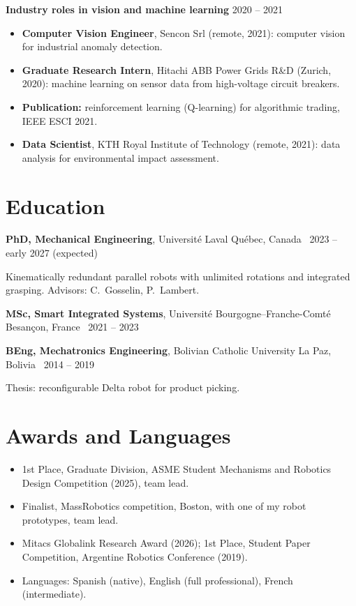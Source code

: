 \documentclass[10pt,letterpaper]{article}
\begin{document}
\vspace{3pt}
\textbf{Industry roles in vision and machine learning} \hfill {\color{muted}2020 -- 2021}\par
\begin{itemize}
\item \textbf{Computer Vision Engineer}, Sencon Srl (remote, 2021): computer vision for industrial anomaly detection.
\item \textbf{Graduate Research Intern}, Hitachi ABB Power Grids R\&D (Zurich, 2020): machine learning on sensor data from high-voltage circuit breakers.
\item \textbf{Publication:} reinforcement learning (Q-learning) for algorithmic trading, IEEE ESCI 2021.
\item \textbf{Data Scientist}, KTH Royal Institute of Technology (remote, 2021): data analysis for environmental impact assessment.
\end{itemize}

\section{Education}
\textbf{PhD, Mechanical Engineering}, Universit\'e Laval \hfill {\color{muted}Qu\'ebec, Canada \textbar\ 2023 -- early 2027 (expected)}\par
{\small Kinematically redundant parallel robots with unlimited rotations and integrated grasping. Advisors: C.~Gosselin, P.~Lambert.}\par\vspace{2pt}
\textbf{MSc, Smart Integrated Systems}, Universit\'e Bourgogne--Franche-Comt\'e \hfill {\color{muted}Besan\c{c}on, France \textbar\ 2021 -- 2023}\par\vspace{2pt}
\textbf{BEng, Mechatronics Engineering}, Bolivian Catholic University \hfill {\color{muted}La Paz, Bolivia \textbar\ 2014 -- 2019}\par
{\small Thesis: reconfigurable Delta robot for product picking.}

\section{Awards and Languages}
\begin{itemize}
\item 1st Place, Graduate Division, ASME Student Mechanisms and Robotics Design Competition (2025), team lead.
\item Finalist, MassRobotics competition, Boston, with one of my robot prototypes, team lead.
\item Mitacs Globalink Research Award (2026); 1st Place, Student Paper Competition, Argentine Robotics Conference (2019).
\item Languages: Spanish (native), English (full professional), French (intermediate).
\end{itemize}
\end{document}
